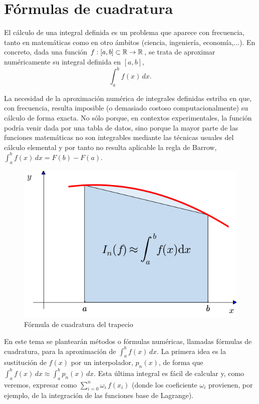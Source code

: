\newcommand{\ox}{\overline x}

\section{Fórmulas de cuadratura}
\label{sect:form-de-cuadratura}



El cálculo de una integral definida es un problema que aparece con
frecuencia, tanto en matemáticas como en otro ámbitos (ciencia,
ingeniería, economía,...). En concreto, dada una función
$f:[a,b]\subset\operatorname{{\mathbb R}}\to\operatorname{{\mathbb R}}$, se trata de aproximar numéricamente su
integral definida en $[a,b]$,
\begin{equation*}
  \int_a^bf(x)\,dx.
\end{equation*}

La necesidad de la aproximación numérica de integrales definidas
estriba en que, con frecuencia, resulta imposible (o demasiado costoso
computacionalmente) su cálculo de forma exacta. No sólo porque, en
contextos experimentales, la función podría venir dada por una tabla
de datos, sino porque la mayor parte de las funciones matemáticas no
son integrables mediante las técnicas usuales del cálculo elemental
y por tanto no resulta aplicable la regla de Barrow, $\int_a^b f(x)\,
dx=F(b)-F(a)$.

\begin{figure}
  \centering
    \includegraphics[width=0.5\linewidth]{tema3/fc-trapecio}
  \caption{Fórmula de cuadratura del trapecio}
  \label{fig:fc-trapecio}
\end{figure}
En este tema se plantearán métodos o fórmulas numéricas, llamadas
fórmulas de cuadratura, para la aproximación de $\int_a^b f(x)\,
dx$. La primera idea es la sustitución de $f(x)$ por un interpolador,
$p_n(x)$, de forma que $\int_a^bf(x)\,dx \approx \int_a^b p_n(x)\,
dx$. Esta última integral es fácil de calcular y, como veremos,
expresar como $\sum_{i=0}^n \omega_i \, f(x_i)$ (donde los coeficiente
$\omega_i$ provienen, por ejemplo, de la integración de las
funciones base de Lagrange).


